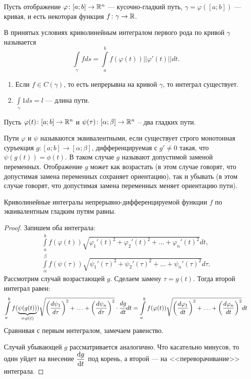 Пусть отображение $\varphi \colon [a; b] \to \mathbb{R}^n$ --- кусочно-гладкий путь, $\gamma = \varphi([a;b])$ --- кривая, и есть некоторая функция $f\colon \gamma \to \mathbb{R}$.
\begin{Def}
    В принятых условиях криволинейным интегралом первого рода по кривой $\gamma$ называется
    $$
        \int\limits_\gamma fds =  \int\limits_{a}^{b} f(\varphi(t))||\varphi'(t)||dt.
    $$
\end{Def}
\begin{Properties}
    \begin{enumerate}
        \item Если $f\in C(\gamma)$, то есть непрерывна на кривой $\gamma$, то интеграл существует.
        \item $\int\limits_{\gamma} 1ds = l$ --- длина пути.
    \end{enumerate}
\end{Properties}
Пусть $\varphi(t)\colon [a;b] \to \mathbb{R}^n$ и $\psi(\tau) \colon [\alpha; \beta] \to \mathbb{R}^n$ -- два гладких пути.
\begin{Def}
    Пути $\varphi$ и $\psi$ называются эквивалентными, если существует строго монотонная суръекция $g\colon [a;b] \to [\alpha; \beta]$, дифференцируемая с $g' \neq 0$ такая, что $\psi(g(t)) = \phi(t)$. В таком случае $g$ называют допустимой заменой переменных. Отображение $g$ может как возрастать (в этом случае говорят, что допустимая замена переменных сохраняет ориентацию), так и убывать (в этом случае говорят, что допустимая замена переменных меняет ориентацию пути).
\end{Def}
\begin{Statement}
    Криволинейные интегралы непрерывно-дифференцируемой функции $f$ по эквивалентным гладким путям равны.
\end{Statement}
\begin{proof}
    Запишем оба интеграла:
    \begin{gather}
        \int\limits_{a}^{b}f(\varphi(t))\sqrt{\varphi_1'(t)^2 + \varphi_2'(t)^2 + \ldots + \varphi_n'(t)^2}dt,\\
        \int\limits_{\alpha}^{\beta}f(\psi(\tau))\sqrt{\psi_1'(\tau)^2 + \psi_2'(\tau)^2 + \ldots + \psi_n'(\tau)^2}d\tau.
    \end{gather}
    Рассмотрим случай возрастающей $g$. Сделаем замену $\tau = g(t)$. Тогда второй интеграл равен:
    \begin{gather}
        \int\limits_{a}^{b}f(\underbrace{\psi(g(t))}_{=\varphi(t)})\sqrt{\left(\frac{d\psi_1}{d\tau}\right)^2 + \ldots + \left(\frac{d\psi_n}{d\tau}\right)^2}\cdot \cfrac{dg}{dt}dt 
        = \int\limits_{a}^{b}f(\varphi(t))\sqrt{\left(\frac{d\varphi_1}{dt}\right)^2 + \ldots + \left(\frac{d\varphi_n}{dt}\right)^2}dt
    \end{gather}
    Сравнивая с первым интегралом, замечаем равенство.
    
    Случай убывающей $g$ рассматривается аналогично. Что касательно минусов, то один уйдет на внесение $\dfrac{\mathrm{d} g}{\mathrm{d} t}$ под корень, а второй --- на <<переворачивание>> интеграла.
\end{proof}
